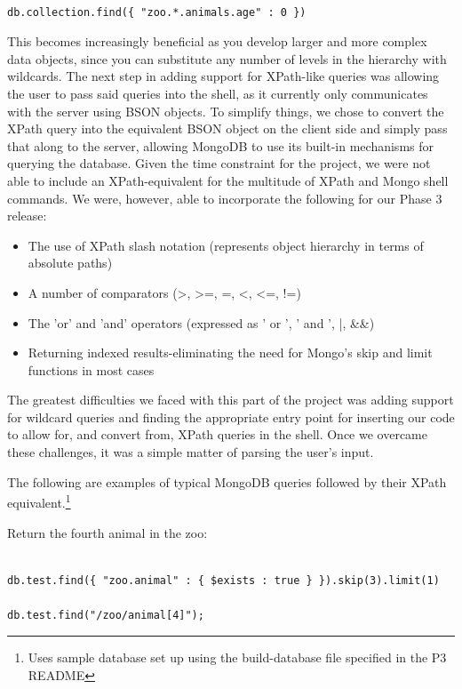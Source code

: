 \documentclass{../dependencies/acm_proc_article-sp}
\begin{document}
\begin{lstlisting}

db.collection.find({ "zoo.*.animals.age" : 0 })
\end{lstlisting}

This becomes increasingly beneficial as you develop larger and more complex data objects, since you can substitute any number of levels in the hierarchy with wildcards. The next step in adding support for XPath-like queries was allowing the user to pass said queries into the shell, as it currently only communicates with the server using BSON objects. To simplify things, we chose to convert the XPath query into the equivalent BSON object on the client side and simply pass that along to the server, allowing MongoDB to use its built-in mechanisms for querying the database. Given the time constraint for the project, we were not able to include an XPath-equivalent for the multitude of XPath and Mongo shell commands. We were, however, able to incorporate the following for our Phase 3 release:

\begin{itemize}
  \item	The use of XPath slash notation (represents object hierarchy in terms of absolute paths)
  \item	A number of comparators (>, >=, =, <, <=, !=)
  \item	The 'or' and 'and' operators (expressed as ' or ', ' and ', |, \&\&)
  \item	Returning indexed results-eliminating the need for Mongo's skip and limit functions in most cases
\end{itemize}

The greatest difficulties we faced with this part of the project was adding support for wildcard queries and finding the appropriate entry point for inserting our code to allow for, and convert from, XPath queries in the shell. Once we overcame these challenges, it was a simple matter of parsing the user's input.

The following are examples of typical MongoDB queries followed by their XPath equivalent.\footnote{Uses sample database set up using the build-database file specified in the P3 README}

Return the fourth animal in the zoo:
\begin{lstlisting}

db.test.find({ "zoo.animal" : { $exists : true } }).skip(3).limit(1)

db.test.find("/zoo/animal[4]");
\end{lstlisting}
\end{document}
